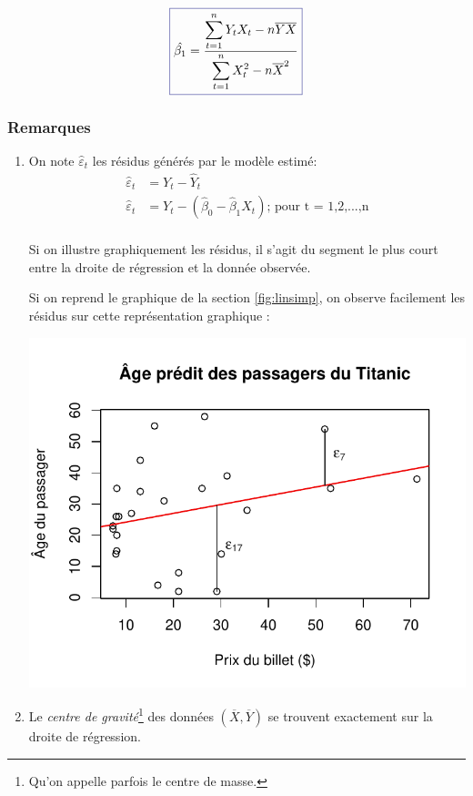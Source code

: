 \documentclass[11pt,french]{report}
\begin{document}
\begin{equation}
\label{eq:beta1}
\color{Blue}
\boxed{\color{black}
\hat{\beta_1} = \frac{\displaystyle\sum_{t=1}^n Y_t X_t - n\overline{Y}\overline{X}}{\displaystyle\sum_{t=1}^n X_t^2 - n\overline{X}^2}
}
\end{equation}

\subsubsection{Remarques}

\begin{enumerate}
\item On note $\hat{\varepsilon}_t$ les résidus générés par le modèle estimé:
\begin{align*}
\hat{\varepsilon}_t &= Y_t - \hat{Y}_t \\
\hat{\varepsilon}_t &= Y_t - (\hat{\beta}_0 - \hat{\beta}_1 X_t) \text{; pour t = 1,2,...,n} \\
\end{align*}

Si on illustre graphiquement les résidus, il s'agit du segment le plus court entre la droite de régression et la donnée observée. 

\bigskip
Si on reprend le graphique de la section \ref{fig:linsimp}, on observe facilement les résidus sur cette représentation graphique :

\includegraphics{notes_de_cours-006}

\item Le \emph{centre de gravité}\footnote{Qu'on appelle parfois le centre de masse.} des données $(\overline{X}, \overline{Y})$ se trouvent exactement sur la droite de régression.
\bigskip


\end{enumerate}
\end{document}
